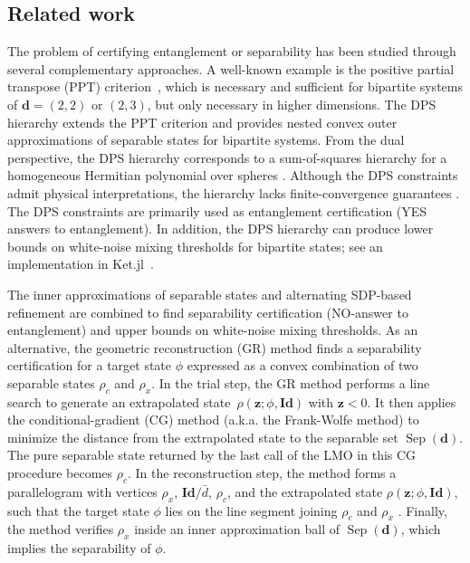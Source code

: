 \documentclass[smallextended]{svjour3}
\DeclareMathOperator{\sep}{Sep}
\newcommand{\1}{\mathbf{1}}
\newcommand{\z}{\mathbf{z}}
\newcommand{\Id}{\mathbf{Id}}
\newcommand{\vc}[1]{\mathbf{#1}}
\newcommand{\vd}{\vc{d}}
\begin{document}
\subsection{Related work}
The problem of certifying entanglement or separability has been studied through several complementary approaches. A well-known example is the positive partial transpose (PPT) criterion~\cite{Horodecki1997separability,peres1996separability}, which is necessary and sufficient for bipartite systems of $\vd=(2,2)$ or $(2,3)$, but only necessary in higher dimensions.
The DPS hierarchy \cite{doherty2004complete,Navascues2009complete} extends the PPT criterion and provides nested convex outer approximations of separable states for bipartite systems. From the dual perspective, the DPS hierarchy corresponds to a sum-of-squares hierarchy for a homogeneous Hermitian polynomial over spheres \cite{fang2021sum}. Although the DPS constraints admit physical interpretations, the hierarchy lacks finite-convergence guarantees \cite{fawzi2021set}.  The DPS constraints are primarily used as entanglement certification (YES answers to entanglement). In addition, the DPS  hierarchy can produce lower bounds on white-noise mixing thresholds for bipartite states; see an implementation in Ket.jl~\cite{araujo_2025_15837771}.

The inner approximations of separable states and alternating SDP-based refinement are combined to find  separability certification (NO-answer to entanglement) \cite{Ohst2024certifying} and upper bounds on  white-noise mixing thresholds. As an alternative, the geometric reconstruction (GR) method \cite{Shang2018convex} finds a separability certification for a target state $\phi$  expressed as a convex combination of two separable states $\rho_c$ and $\rho_x$. In the trial step, the GR method performs a line search to generate an extrapolated state~$\rho(\z; \phi, \Id)$ with $\z < 0$. It then applies the conditional-gradient (CG) method (a.k.a. the Frank-Wolfe method) \cite{fwbook,Frank1956algorithm,pokutta2024frank} to minimize the distance from the extrapolated state to the separable set $\sep(\vd)$. The pure separable state returned by the last call of the LMO in this CG procedure becomes $\rho_c$. In the reconstruction step, the method forms a parallelogram with vertices $\rho_x$, $\Id/\bar{d}$, $\rho_c$, and the extrapolated state $\rho(\z; \phi, \Id)$, such that the target state $\phi$ lies on the line segment joining $\rho_c$ and $\rho_x$ \cite{Hu_2023_algorithm}. Finally, the method verifies $\rho_x$ inside an inner approximation ball of $\sep(\vd)$, which implies the separability of $\phi$.
\end{document}

